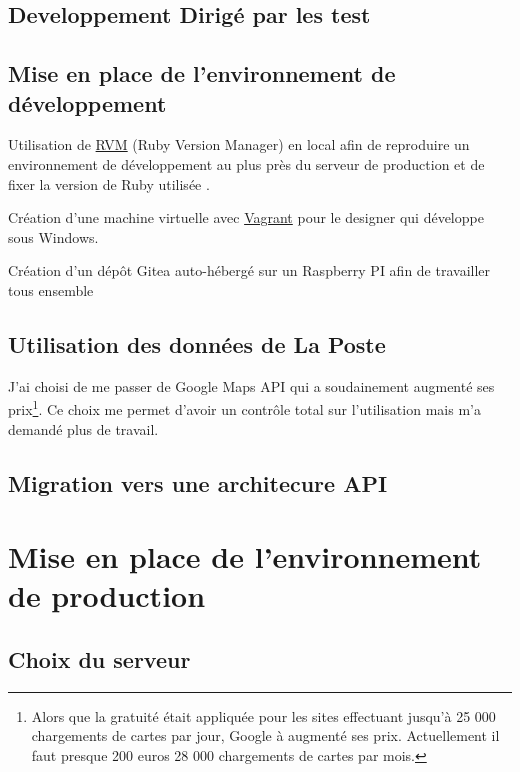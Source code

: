 \documentclass[]{report}
\begin{document}
  \section{Developpement Dirigé par les test}


  \section{Mise en place de l'environnement de développement}

    Utilisation de \href{https://rvm.io}{RVM} (Ruby Version Manager) en local afin de reproduire un environnement de développement au plus près du serveur de production et de fixer la version de Ruby utilisée .

    Création d'une machine virtuelle avec \href{https://www.vagrantup.com}{Vagrant} pour le designer qui développe sous Windows.

    Création d'un dépôt Gitea auto-hébergé sur un Raspberry PI afin de travailler tous ensemble

  \section{Utilisation des données de La Poste}

    J'ai choisi  de me passer de Google Maps API qui a soudainement augmenté ses prix\footnote{Alors que la gratuité était appliquée pour les sites effectuant jusqu'à 25 000 chargements de cartes par jour, Google à augmenté ses prix. Actuellement il faut presque 200 euros 28 000 chargements de cartes par mois.}. Ce choix me permet d'avoir un contrôle total sur l'utilisation mais m'a demandé plus de travail.

  \section{Migration vers une architecure API}


\chapter{Mise en place de l’environnement de production}

  \section{Choix du serveur}
\end{document}
